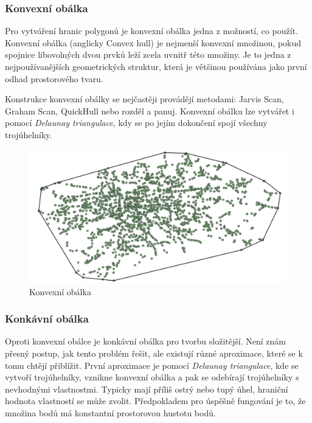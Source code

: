 \subsubsection{Konvexní obálka}
\label{konv_obalka}

Pro vytváření hranic polygonů je konvexní obálka jedna z možností, co použít. Konvexní obálka (anglicky Convex hull)
je nejmenší konvexní množinou, pokud spoj\-nice  libovolných dvou prvků leží zcela uvnitř této množiny.
Je to jedna z nejpoužívanějších geometrických struktur, která je většinou používána jako první odhad
prostorového tvaru.

Konstrukce konvexní obálky se nejčastěji provádějí metodami: Jarvis Scan, Graham Scan, QuickHull nebo
rozděl a panuj. Konvexní obálku lze vytvářet i pomocí \textit{Delaunay triangulace}, kdy se po jejím dokončení
spojí všechny trojúhelníky.

\begin{figure}[H] \centering
    \includegraphics[width=400pt]{./pictures/convexHull.png}
    \caption[Konvexní obálka]{Konvexní obálka}
	\label{fig:convexHull}              
\end{figure}

\subsubsection{Konkávní obálka}
\label{konk_obalka}
 
Oproti konvexní obálce je konkávní obálka pro tvorbu složitější. Není znám přesný postup,
jak tento problém řešit, ale existují různé aproximace, které se k tomu chtějí přiblížit.
První aproximace je pomocí \textit{Delaunay triangulace}, kde se vytvoří trojúhelníky, vznikne
konvexní obálka a pak se odebírají trojúhelníky s nevhodnými vlastnostmi. Typicky mají příliš ostrý nebo tupý
úhel, hraniční hodnota vlastností se může zvolit.
Předpokladem pro úspěšně fungování je to, že množina bodů má konstantní
prostorovou hustotu bodů.

